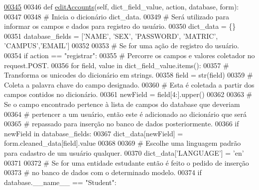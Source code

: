 \begin{DoxyCode}
\hypertarget{classAdm_1_1AdmUnit_1_1BusAdm_l00345}{}\hyperlink{classAdm_1_1AdmUnit_1_1BusAdm_a0650e636805d049ce37fae5b0ac132e0}{00345} 
00346     \textcolor{keyword}{def }\hyperlink{classAdm_1_1AdmUnit_1_1BusAdm_a0650e636805d049ce37fae5b0ac132e0}{editAccounts}(self, dict\_field\_value, action, database, form):
00347         
00348         \textcolor{comment}{# Inicia o dicionário dict\_data.
}
00349         \textcolor{comment}{#   Será utilizado para informar os campos e dados para registro do usuário.
}
00350         dict\_data = \{\}
00351         database\_fields = [\textcolor{stringliteral}{'NAME'}, \textcolor{stringliteral}{'SEX'}, \textcolor{stringliteral}{'PASSWORD'}, \textcolor{stringliteral}{'MATRIC'}, \textcolor{stringliteral}{'CAMPUS'},\textcolor{stringliteral}{'EMAIL'}]
00352 
00353         \textcolor{comment}{# Se for uma ação de registro do usuário.
}
00354         \textcolor{keywordflow}{if} action == \textcolor{stringliteral}{"registrar"}: 
00355             \textcolor{comment}{# Percorre os campos e valores coletador no request.POST.
}
00356             \textcolor{keywordflow}{for} field, value \textcolor{keywordflow}{in} dict\_field\_value.items():
00357                 \textcolor{comment}{# Transforma os unicodes do dicionário em strings.
}
00358                 field = str(field)
00359                 \textcolor{comment}{# Coleta a palavra chave do campo designado.
}
00360                 \textcolor{comment}{#   Esta é coletada a partir dos campos contidos no dicionário.
}
00361                 newField = field[4:].upper()
00362 
00363                 \textcolor{comment}{# Se o campo encontrado pertence à lista de campos do database que deveriam
}
00364                 \textcolor{comment}{# pertencer a um usuário, então este é adicionado ao dicionário que será
}
00365                 \textcolor{comment}{# repassado para inserção no banco de dados posteriormente.
}
00366                 \textcolor{keywordflow}{if} newField \textcolor{keywordflow}{in} database\_fields:
00367                     dict\_data[newField] = form.cleaned\_data[field].value
00368 
00369             \textcolor{comment}{# Escolhe uma linguagem padrão para cadastro de um usuário qualquer.
}
00370             dict\_data[\textcolor{stringliteral}{'LANGUAGE'}] = \textcolor{stringliteral}{'en'}
00371 
00372             \textcolor{comment}{# Se for uma entidade estudante então é feito o pedido de inserção 
}
00373             \textcolor{comment}{# no banco de dados com o determinado modelo.
}
00374             \textcolor{keywordflow}{if} database.\_\_name\_\_ == \textcolor{stringliteral}{"Student"}:

\end{DoxyCode}
